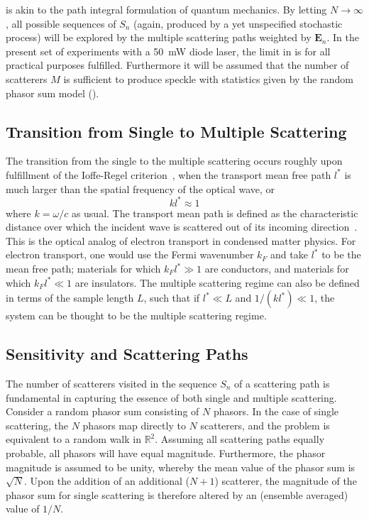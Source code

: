  is akin to the path integral formulation of
quantum mechanics.  By letting $N\to\infty$, all possible sequences of $S_n$
(again, produced by a yet unspecified stochastic process) will be explored by
the multiple scattering paths weighted by $\mathbf{E}_n$.  In the present set
of experiments with a \SI{50}{\milli\watt} diode laser, the limit in
 is for all practical purposes fulfilled.
Furthermore it will be assumed that the number of scatterers $M$ is sufficient
to produce speckle with statistics given by the random phasor sum model
().



\subsection{Transition from Single to Multiple Scattering}
The transition from the single to the multiple scattering occurs roughly upon
fulfillment of the Ioffe-Regel criterion~\cite{ioffe1960non}, when the
transport mean free path $l^*$ is much larger than the spatial frequency of
the optical wave, or
\begin{equation}
  k l^* \approx 1
\end{equation}
where $k=\omega/c$ as usual.  The transport mean path is defined as the
characteristic distance over which the incident wave is scattered out of its
incoming direction~\cite{berkovits1994correlations}.  This is the optical
analog of electron transport in condensed matter physics.  For electron transport, one would
use the Fermi wavenumber $k_F$ and take $l^*$ to be the mean free path;
materials for which $k_F l^* \gg 1$ are conductors, and materials for which
$k_F l^* \ll 1$ are insulators.  The multiple scattering regime can also be
defined in terms of the sample length $L$, such that if $l^* \ll L$ and $1/(k
  l^*) \ll 1$, the system can be thought to be the multiple scattering regime.

\subsection{Sensitivity and Scattering Paths}
\label{sec:senspaths}
The number of scatterers visited in the sequence $S_n$ of a scattering path is
fundamental in capturing the essence of both single and multiple scattering.
Consider a random phasor sum consisting of $N$ phasors.  In the case of single
scattering, the $N$ phasors map directly to $N$ scatterers, and the problem is
equivalent to a random walk in $\mathbb{R}^2$.  Assuming all scattering paths
equally probable, all phasors will have equal magnitude.  Furthermore, the
phasor magnitude is assumed to be unity, whereby the mean value of the phasor
sum is $\sqrt{N}$.  Upon the addition of an additional ($N+1$) scatterer, the
magnitude of the phasor sum for single scattering is therefore altered by an
(ensemble averaged) value of $1/N$.

